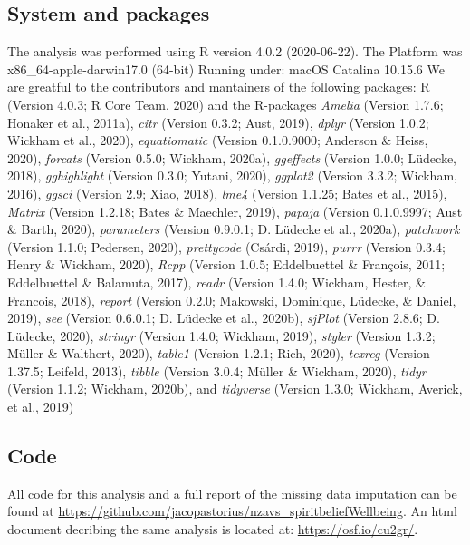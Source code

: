 \documentclass[
  english,
  man,floatsintext]{apa6}
\begin{document}
\hypertarget{system-and-packages}{%
\subsection{System and packages}\label{system-and-packages}}

The analysis was performed using R version 4.0.2 (2020-06-22). The Platform was x86\_64-apple-darwin17.0 (64-bit) Running under: macOS Catalina 10.15.6
We are greatful to the contributors and mantainers of the following packages:
R (Version 4.0.3; R Core Team, 2020) and the R-packages \emph{Amelia} (Version 1.7.6; Honaker et al., 2011a), \emph{citr} (Version 0.3.2; Aust, 2019), \emph{dplyr} (Version 1.0.2; Wickham et al., 2020), \emph{equatiomatic} (Version 0.1.0.9000; Anderson \& Heiss, 2020), \emph{forcats} (Version 0.5.0; Wickham, 2020a), \emph{ggeffects} (Version 1.0.0; Lüdecke, 2018), \emph{gghighlight} (Version 0.3.0; Yutani, 2020), \emph{ggplot2} (Version 3.3.2; Wickham, 2016), \emph{ggsci} (Version 2.9; Xiao, 2018), \emph{lme4} (Version 1.1.25; Bates et al., 2015), \emph{Matrix} (Version 1.2.18; Bates \& Maechler, 2019), \emph{papaja} (Version 0.1.0.9997; Aust \& Barth, 2020), \emph{parameters} (Version 0.9.0.1; D. Lüdecke et al., 2020a), \emph{patchwork} (Version 1.1.0; Pedersen, 2020), \emph{prettycode} (Csárdi, 2019), \emph{purrr} (Version 0.3.4; Henry \& Wickham, 2020), \emph{Rcpp} (Version 1.0.5; Eddelbuettel \& François, 2011; Eddelbuettel \& Balamuta, 2017), \emph{readr} (Version 1.4.0; Wickham, Hester, \& Francois, 2018), \emph{report} (Version 0.2.0; Makowski, Dominique, Lüdecke, \& Daniel, 2019), \emph{see} (Version 0.6.0.1; D. Lüdecke et al., 2020b), \emph{sjPlot} (Version 2.8.6; D. Lüdecke, 2020), \emph{stringr} (Version 1.4.0; Wickham, 2019), \emph{styler} (Version 1.3.2; Müller \& Walthert, 2020), \emph{table1} (Version 1.2.1; Rich, 2020), \emph{texreg} (Version 1.37.5; Leifeld, 2013), \emph{tibble} (Version 3.0.4; Müller \& Wickham, 2020), \emph{tidyr} (Version 1.1.2; Wickham, 2020b), and \emph{tidyverse} (Version 1.3.0; Wickham, Averick, et al., 2019)

\hypertarget{code}{%
\subsection{Code}\label{code}}

All code for this analysis and a full report of the missing data imputation can be found at \url{https://github.com/jacopastorius/nzavs_spiritbeliefWellbeing}. An html document decribing the same analysis is located at: \url{https://osf.io/cu2gr/}.
\end{document}
